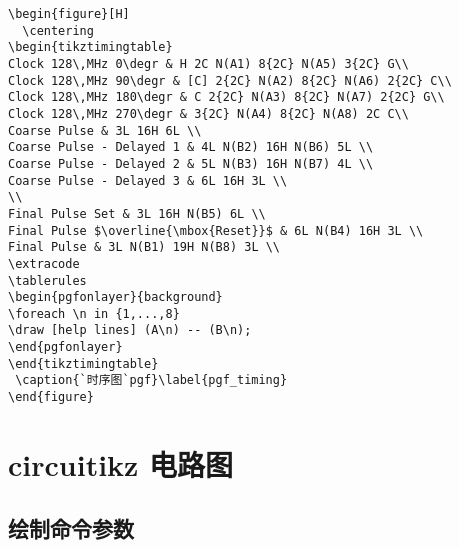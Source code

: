 \begin{lstlisting}
\begin{figure}[H]
  \centering
\begin{tikztimingtable}
Clock 128\,MHz 0\degr & H 2C N(A1) 8{2C} N(A5) 3{2C} G\\
Clock 128\,MHz 90\degr & [C] 2{2C} N(A2) 8{2C} N(A6) 2{2C} C\\
Clock 128\,MHz 180\degr & C 2{2C} N(A3) 8{2C} N(A7) 2{2C} G\\
Clock 128\,MHz 270\degr & 3{2C} N(A4) 8{2C} N(A8) 2C C\\
Coarse Pulse & 3L 16H 6L \\
Coarse Pulse - Delayed 1 & 4L N(B2) 16H N(B6) 5L \\
Coarse Pulse - Delayed 2 & 5L N(B3) 16H N(B7) 4L \\
Coarse Pulse - Delayed 3 & 6L 16H 3L \\
\\
Final Pulse Set & 3L 16H N(B5) 6L \\
Final Pulse $\overline{\mbox{Reset}}$ & 6L N(B4) 16H 3L \\
Final Pulse & 3L N(B1) 19H N(B8) 3L \\
\extracode
\tablerules
\begin{pgfonlayer}{background}
\foreach \n in {1,...,8}
\draw [help lines] (A\n) -- (B\n);
\end{pgfonlayer}
\end{tikztimingtable}
 \caption{`时序图`pgf}\label{pgf_timing}
\end{figure}
\end{lstlisting}

\tikzexternalenable

\section{circuitikz 电路图}
\tikzexternaldisable
\subsection{绘制命令参数}


